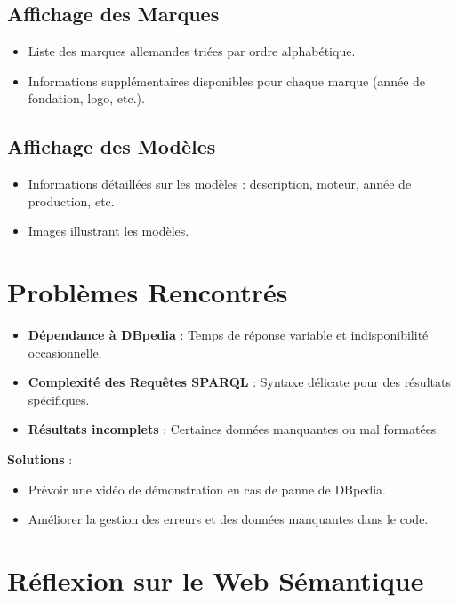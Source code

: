 \documentclass[a4paper]{article}
\begin{document}
\subsection{Affichage des Marques}
\begin{itemize}
    \item Liste des marques allemandes triées par ordre alphabétique.
    \item Informations supplémentaires disponibles pour chaque marque (année de fondation, logo, etc.).
\end{itemize}

\subsection{Affichage des Modèles}
\begin{itemize}
    \item Informations détaillées sur les modèles : description, moteur, année de production, etc.
    \item Images illustrant les modèles.
\end{itemize}

\newpage

\section{Problèmes Rencontrés}
\begin{itemize}
    \item \textbf{Dépendance à DBpedia} : Temps de réponse variable et indisponibilité occasionnelle.
    \item \textbf{Complexité des Requêtes SPARQL} : Syntaxe délicate pour des résultats spécifiques.
    \item \textbf{Résultats incomplets} : Certaines données manquantes ou mal formatées.
\end{itemize}

\textbf{Solutions} :
\begin{itemize}
    \item Prévoir une vidéo de démonstration en cas de panne de DBpedia.
    \item Améliorer la gestion des erreurs et des données manquantes dans le code.
\end{itemize}

\newpage

\section{Réflexion sur le Web Sémantique}
\end{document}
